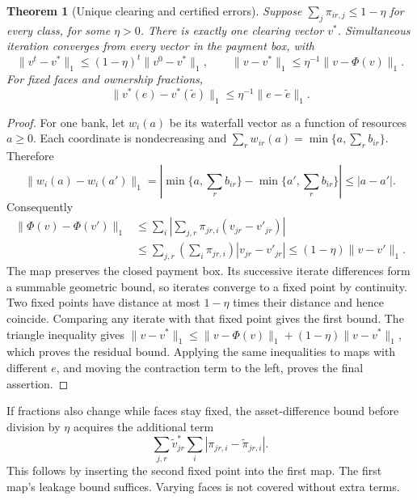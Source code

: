 \documentclass[11pt,a4paper]{article}
\numberwithin{equation}{section}
\newtheorem{theorem}{Theorem}[section]
\theoremstyle{definition}
\begin{document}
\begin{theorem}[Unique clearing and certified errors]\label{thm:clearing}
Suppose \(\sum_j\pi_{ir,j}\le1-\eta\) for every class, for some \(\eta>0\).
There is exactly one clearing vector \(v^*\). Simultaneous iteration
converges from every vector in the payment box, with
\[
 \|v^t-v^*\|_1\le(1-\eta)^t\|v^0-v^*\|_1,\qquad
 \|v-v^*\|_1\le\eta^{-1}\|v-\Phi(v)\|_1.
\]
For fixed faces and ownership fractions,
\[
 \|v^*(e)-v^*(\widetilde e)\|_1
       \le \eta^{-1}\|e-\widetilde e\|_1.
\]
\end{theorem}
\begin{proof}
For one bank, let \(w_i(a)\) be its waterfall vector as a function of
resources \(a\ge0\). Each coordinate is nondecreasing and
\(\sum_r w_{ir}(a)=\min\{a,\sum_r b_{ir}\}\). Therefore
\[
\|w_i(a)-w_i(a')\|_1
 =\left|\min\{a,\sum_r b_{ir}\}-\min\{a',\sum_r b_{ir}\}\right|
 \le |a-a'|.
\]
Consequently
\[
\begin{split}
\|\Phi(v)-\Phi(v')\|_1
&\le\sum_i\left|\sum_{j,r}\pi_{jr,i}(v_{jr}-v'_{jr})\right|\\
&\le\sum_{j,r}\left(\sum_i\pi_{jr,i}\right)|v_{jr}-v'_{jr}|
 \le(1-\eta)\|v-v'\|_1.
\end{split}
\]
The map preserves the closed payment box. Its successive iterate
differences form a summable geometric bound, so iterates converge to a
fixed point by continuity. Two fixed points have distance at most
\(1-\eta\) times their distance and hence coincide. Comparing any iterate
with that fixed point gives the first bound. The triangle inequality gives
\(\|v-v^*\|_1\le\|v-\Phi(v)\|_1+(1-\eta)\|v-v^*\|_1\),
which proves the residual bound. Applying the same inequalities to maps
with different \(e\), and moving the contraction term to the left, proves
the final assertion.
\end{proof}

If fractions also change while faces stay fixed, the asset-difference
bound before division by \(\eta\) acquires the additional term
\[
\sum_{j,r}\widetilde v^*_{jr}
                  \sum_i|\pi_{jr,i}-\widetilde\pi_{jr,i}|.
\]
This follows by inserting the second fixed point into the first map.
The first map's leakage bound suffices. Varying faces is not covered
without extra terms.
\end{document}
